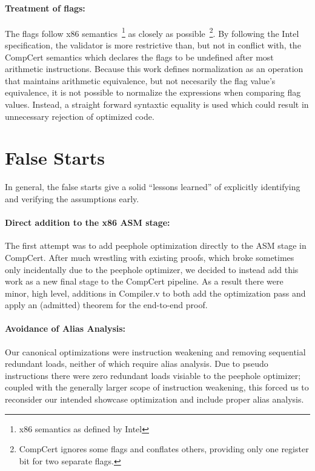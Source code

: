 \documentclass{article}
\begin{document}
\paragraph{Treatment of flags: } 
The flags follow x86 semantics~\footnote{x86 semantics as defined by
  Intel} as closely as possible~\footnote{CompCert ignores some flags
  and conflates others, providing only one register bit for two
  separate flags.}.  By following the Intel specification, the
validator is more restrictive than, but not in conflict with, the
CompCert semantics which declares the flags to be undefined after most
arithmetic instructions.  Because this work defines normalization as
an operation that maintains arithmetic equivalence, but not necesarily
the flag value's equivalence, it is not possible to normalize the
expressions when comparing flag values.  Instead, a straight forward
syntaxtic equality is used which could result in unnecessary rejection
of optimized code.

\section{False Starts}
In general, the false starts give a solid ``lessons learned'' of
explicitly identifying and verifying the assumptions early.

\paragraph{Direct addition to the x86 ASM stage: }
The first attempt was to add peephole optimization directly to the ASM
stage in CompCert.  After much wrestling with existing proofs, which
broke sometimes only incidentally due to the peephole optimizer, we
decided to instead add this work as a new final stage to the CompCert
pipeline.  As a result there were minor, high level, additions in
Compiler.v to both add the optimization pass and apply an (admitted)
theorem for the end-to-end proof.

\paragraph{Avoidance of Alias Analysis: }
Our canonical optimizations were instruction weakening and removing
sequential redundant loads, neither of which require alias analysis.
Due to pseudo instructions there were zero redundant loads visiable to
the peephole optimizer; coupled with the generally larger scope of
instruction weakening, this forced us to reconsider our intended
showcase optimization and include proper alias analysis.
\end{document}
